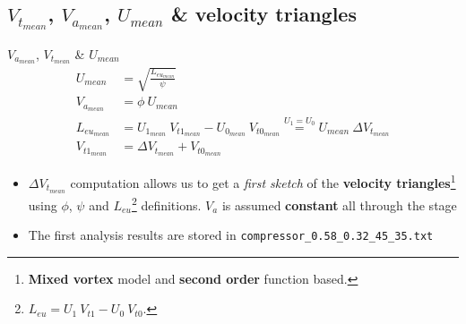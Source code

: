 	\subsection{$V_{t_{mean}}$, $V_{a_{mean}}$, $U_{mean}$ \& velocity triangles}
\begin{frame}[fragile]{$V_{a_{mean}}$, $V_{t_{mean}}$ \& $U_{mean}$}
	\vspace{-0.8cm}
	\begin{align}
		U_{mean}      & = \sqrt{\frac{L_{eu_{mean}}}{\psi}} \nonumber \\ 
		V_{a_{mean}}  & = \phi \ U_{mean} \nonumber \\
		L_{eu_{mean}} & = U_{1_{mean}} \ V_{t1_{mean}} - U_{0_{mean}} \ V_{t0_{mean}} \overset{U_1 = U_0}{=} U_{mean} \ \Delta V_{t_{mean}} \nonumber \\
		V_{t1_{mean}} & = \Delta V_{t_{mean}} + V_{t0_{mean}} \nonumber  
	\end{align}
	\vspace{-0.3cm}
	\begin{itemize}
		\item $\Delta V_{t_{mean}}$ computation allows us to get a \textit{first sketch} of the \textbf{velocity triangles}\footnote{\textbf{Mixed vortex} model and \textbf{second order} function based.} using $\phi$, $\psi$ and $L_{eu}$\footnote{$L_{eu} = U_1 \ V_{t1} - U_0 \ V_{t0}$.} definitions. $V_a$ is assumed \textbf{constant} all through the stage
		\item The first analysis results are stored in \verb|compressor_0.58_0.32_45_35.txt|
	\end{itemize}
\end{frame}

